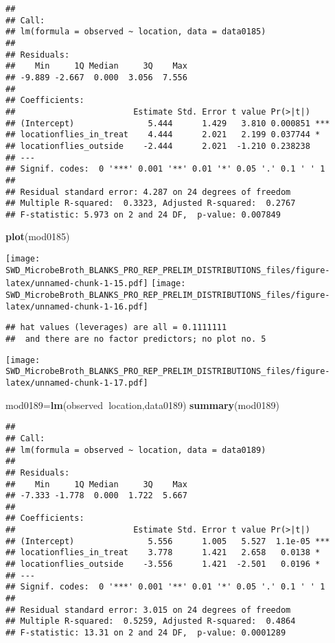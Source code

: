 \documentclass[]{article}
\newenvironment{Shaded}{\begin{snugshade}}{\end{snugshade}}
\newcommand{\KeywordTok}[1]{\textcolor[rgb]{0.13,0.29,0.53}{\textbf{#1}}}
\newcommand{\OperatorTok}[1]{\textcolor[rgb]{0.81,0.36,0.00}{\textbf{#1}}}
\newcommand{\NormalTok}[1]{#1}
\begin{document}
\begin{verbatim}
## 
## Call:
## lm(formula = observed ~ location, data = data0185)
## 
## Residuals:
##    Min     1Q Median     3Q    Max 
## -9.889 -2.667  0.000  3.056  7.556 
## 
## Coefficients:
##                        Estimate Std. Error t value Pr(>|t|)    
## (Intercept)               5.444      1.429   3.810 0.000851 ***
## locationflies_in_treat    4.444      2.021   2.199 0.037744 *  
## locationflies_outside    -2.444      2.021  -1.210 0.238238    
## ---
## Signif. codes:  0 '***' 0.001 '**' 0.01 '*' 0.05 '.' 0.1 ' ' 1
## 
## Residual standard error: 4.287 on 24 degrees of freedom
## Multiple R-squared:  0.3323, Adjusted R-squared:  0.2767 
## F-statistic: 5.973 on 2 and 24 DF,  p-value: 0.007849
\end{verbatim}

\begin{Shaded}
\begin{Highlighting}[]
\KeywordTok{plot}\NormalTok{(mod0185)}
\end{Highlighting}
\end{Shaded}

\texttt{[image: SWD\_MicrobeBroth\_BLANKS\_PRO\_REP\_PRELIM\_DISTRIBUTIONS\_files/figure-latex/unnamed-chunk-1-15.pdf]}
\texttt{[image: SWD\_MicrobeBroth\_BLANKS\_PRO\_REP\_PRELIM\_DISTRIBUTIONS\_files/figure-latex/unnamed-chunk-1-16.pdf]}

\begin{verbatim}
## hat values (leverages) are all = 0.1111111
##  and there are no factor predictors; no plot no. 5
\end{verbatim}

\texttt{[image: SWD\_MicrobeBroth\_BLANKS\_PRO\_REP\_PRELIM\_DISTRIBUTIONS\_files/figure-latex/unnamed-chunk-1-17.pdf]}

\begin{Shaded}
\begin{Highlighting}[]
\NormalTok{mod0189=}\KeywordTok{lm}\NormalTok{(observed}\OperatorTok{~}\NormalTok{location,data0189)}
\KeywordTok{summary}\NormalTok{(mod0189)}
\end{Highlighting}
\end{Shaded}

\begin{verbatim}
## 
## Call:
## lm(formula = observed ~ location, data = data0189)
## 
## Residuals:
##    Min     1Q Median     3Q    Max 
## -7.333 -1.778  0.000  1.722  5.667 
## 
## Coefficients:
##                        Estimate Std. Error t value Pr(>|t|)    
## (Intercept)               5.556      1.005   5.527  1.1e-05 ***
## locationflies_in_treat    3.778      1.421   2.658   0.0138 *  
## locationflies_outside    -3.556      1.421  -2.501   0.0196 *  
## ---
## Signif. codes:  0 '***' 0.001 '**' 0.01 '*' 0.05 '.' 0.1 ' ' 1
## 
## Residual standard error: 3.015 on 24 degrees of freedom
## Multiple R-squared:  0.5259, Adjusted R-squared:  0.4864 
## F-statistic: 13.31 on 2 and 24 DF,  p-value: 0.0001289
\end{verbatim}
\end{document}
